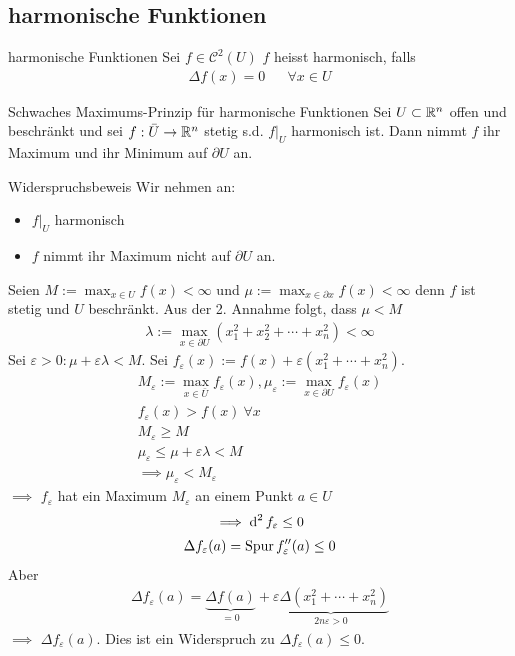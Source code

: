\subsection{harmonische Funktionen}
\begin{Def}{harmonische Funktionen}
  Sei $f\in\mathcal{C}^2(U)$ $f$ heisst harmonisch, falls
  \begin{align*}
    \Delta f(x)=0&&\forall x\in U
  \end{align*}
\end{Def}
\begin{Sat}{Schwaches Maximums-Prinzip für harmonische Funktionen} Sei $U\subset\mathbb{R}^n$ offen und beschränkt und sei $f:\bar U\to\mathbb{R}^n$ stetig s.d. $f|_U$ harmonisch ist. Dann nimmt $f$ ihr Maximum und ihr Minimum auf $\partial U$ an.
\end{Sat}
\begin{Bew}{Widerspruchsbeweis} Wir nehmen an:
  \begin{itemize}
    \item $f|_U$ harmonisch
    \item $f$ nimmt ihr Maximum nicht auf $\partial U$ an.
  \end{itemize}
  Seien $M:=\max_{x \in U} f(x)<\infty$ und $\mu:=\max_{x\in \partial x} f(x)<\infty$ denn $f$ ist stetig und $U$ beschränkt. Aus der 2. Annahme folgt, dass $\mu <M$
  \begin{gather*}
    \lambda:=\max_{x\in \partial U}\left( x_1^2+x_2^2+\cdots+x_n^2 \right)<\infty
  \end{gather*}
  Sei $\varepsilon>0:\mu+\varepsilon\lambda<M$. Sei $f_\varepsilon(x):=f(x)+\varepsilon\left( x_1^2+\cdots+x_n^2 \right)$.
  \begin{gather*}
    M_\varepsilon:=\max_{x\in \bar U}f_\varepsilon(x),\mu_\varepsilon:=\max_{x\in \partial U}f_\varepsilon (x)\\
    f_\varepsilon(x)>f(x)\ \forall x\\
    M_\varepsilon\geq M\\
    \mu_\varepsilon\leq \mu +\varepsilon\lambda<M\\
    \implies \mu_\varepsilon<M_\varepsilon
  \end{gather*}
  $\implies$ $f_\varepsilon$ hat ein Maximum $M_\varepsilon$ an einem Punkt $a\in U$
  \[\implies \operatorname{d}^2f_\varepsilon\leq 0\]
  \begin{gather*}
    \Delta f_\varepsilon(a)=\operatorname{Spur} f_\varepsilon''(a)\leq 0
  \end{gather*}
  Aber
  \begin{gather*}
    \Delta f_\varepsilon(a)=\underbrace{\Delta f(a)}_{=0}+\underbrace{\varepsilon\Delta \left( x_1^2+\cdots+x_n^2 \right)}_{2n\varepsilon>0}
  \end{gather*}
  $\implies$ $\Delta f_\varepsilon(a)$. Dies ist ein Widerspruch zu $\Delta f_\varepsilon(a)\leq 0$.
\end{Bew}
